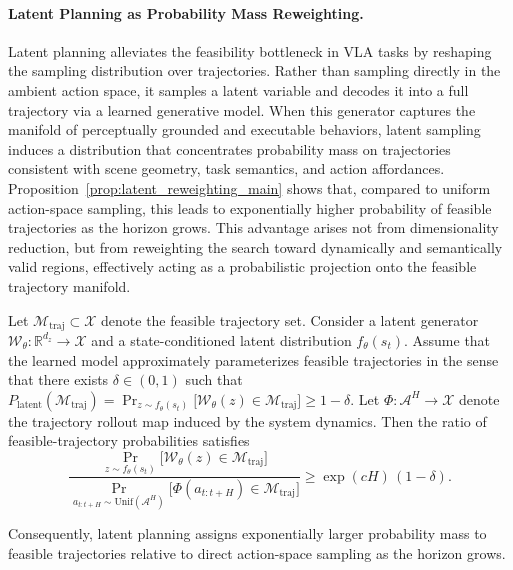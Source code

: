 \paragraph{Latent Planning as Probability Mass Reweighting.}

Latent planning alleviates the feasibility bottleneck in VLA tasks by reshaping the sampling distribution over trajectories.
Rather than sampling directly in the ambient action space, it samples a latent variable and decodes it into a full trajectory via a learned generative model.
When this generator captures the manifold of perceptually grounded and executable behaviors, latent sampling induces a distribution that concentrates probability mass on trajectories consistent with scene geometry, task semantics, and action affordances.
Proposition~\ref{prop:latent_reweighting_main} shows that, compared to uniform action-space sampling, this leads to exponentially higher probability of feasible trajectories as the horizon grows.
This advantage arises not from dimensionality reduction, but from reweighting the search toward dynamically and semantically valid regions, effectively acting as a probabilistic projection onto the feasible trajectory manifold.

\begin{proposition}
\label{prop:latent_reweighting_main}
Let $\mathcal{M}_{\mathrm{traj}} \subset \mathcal{X}$ denote the feasible trajectory set.
Consider a latent generator
$\mathcal{W}_\theta : \mathbb{R}^{d_z} \to \mathcal{X}$
and a state-conditioned latent distribution $f_\theta(s_t)$.
Assume that the learned model approximately parameterizes feasible trajectories
in the sense that there exists $\delta \in (0,1)$ such that
$
\textstyle
P_{\mathrm{latent}}(\mathcal{M}_{\mathrm{traj}})
=
\Pr_{z \sim f_\theta(s_t)}
\big[
\mathcal{W}_\theta(z) \in \mathcal{M}_{\mathrm{traj}}
\big]
\ge 1 - \delta .
$
Let $\Phi : \mathcal{A}^H \to \mathcal{X}$ denote the trajectory rollout map
induced by the system dynamics.
Then the ratio of feasible-trajectory probabilities satisfies
\begin{equation}

\frac{
\Pr_{z \sim f_\theta(s_t)}
\big[
\mathcal{W}_\theta(z) \in \mathcal{M}_{\mathrm{traj}}
\big]
}{
\Pr_{a_{t:t+H} \sim \mathrm{Unif}(\mathcal{A}^H)}
\big[
\Phi(a_{t:t+H}) \in \mathcal{M}_{\mathrm{traj}}
\big]
}
\ge
\exp(cH)\,(1-\delta).
\end{equation}

Consequently, latent planning assigns exponentially larger probability mass
to feasible trajectories relative to direct action-space sampling
as the horizon grows.
\end{proposition}


